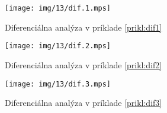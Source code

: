 \begin{priklad}
    \label{prikl:dif1}
    \begin{figure}[H]
        \centering
        \texttt{[image: img/13/dif.1.mps]}
        \caption{Diferenciálna analýza v príklade \ref{prikl:dif1}}
    \end{figure}

    \noindent
    
    
\end{priklad}

\begin{priklad}
    \label{prikl:dif2}
    \begin{figure}[H]
        \centering
        \texttt{[image: img/13/dif.2.mps]}
        \caption{Diferenciálna analýza v príklade \ref{prikl:dif2}}
    \end{figure}

    \noindent
    
    
\end{priklad}

\begin{priklad}
    \label{prikl:dif3}
    \begin{figure}[H]
        \centering
        \texttt{[image: img/13/dif.3.mps]}
        \caption{Diferenciálna analýza v príklade \ref{prikl:dif3}}
    \end{figure}

    \noindent
    
    
\end{priklad}

